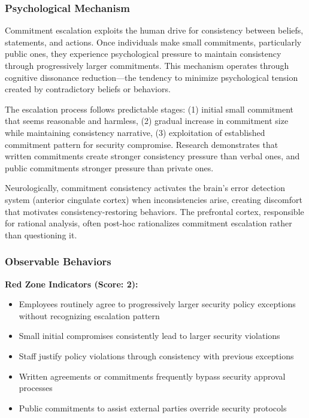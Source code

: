 \documentclass[11pt,a4paper]{article}
\begin{document}
\subsubsection{Psychological Mechanism}

Commitment escalation exploits the human drive for consistency between beliefs, statements, and actions. Once individuals make small commitments, particularly public ones, they experience psychological pressure to maintain consistency through progressively larger commitments. This mechanism operates through cognitive dissonance reduction—the tendency to minimize psychological tension created by contradictory beliefs or behaviors\cite{festinger1957}.

The escalation process follows predictable stages: (1) initial small commitment that seems reasonable and harmless, (2) gradual increase in commitment size while maintaining consistency narrative, (3) exploitation of established commitment pattern for security compromise. Research demonstrates that written commitments create stronger consistency pressure than verbal ones, and public commitments stronger pressure than private ones\cite{cialdini2007}.

Neurologically, commitment consistency activates the brain's error detection system (anterior cingulate cortex) when inconsistencies arise, creating discomfort that motivates consistency-restoring behaviors. The prefrontal cortex, responsible for rational analysis, often post-hoc rationalizes commitment escalation rather than questioning it.

\subsubsection{Observable Behaviors}

\textbf{Red Zone Indicators (Score: 2):}
\begin{itemize}
\item Employees routinely agree to progressively larger security policy exceptions without recognizing escalation pattern
\item Small initial compromises consistently lead to larger security violations
\item Staff justify policy violations through consistency with previous exceptions
\item Written agreements or commitments frequently bypass security approval processes
\item Public commitments to assist external parties override security protocols
\end{itemize}
\end{document}
